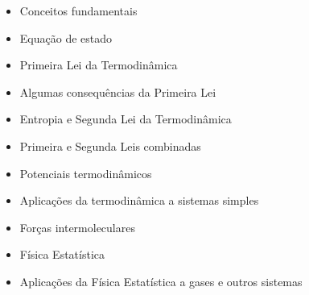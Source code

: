 \documentclass[brazilian]{article}
\begin{document}
\begin{itemize}
    \item Conceitos fundamentais
    \item Equação de estado
    \item Primeira Lei da Termodinâmica
    \item Algumas consequências da Primeira Lei
    \item Entropia e Segunda Lei da Termodinâmica
    \item Primeira e Segunda Leis combinadas
    \item Potenciais termodinâmicos
    \item Aplicações da termodinâmica a sistemas simples
    \item Forças intermoleculares
    \item Física Estatística
    \item Aplicações da Física Estatística a gases e outros sistemas
\end{itemize}
\end{document}
